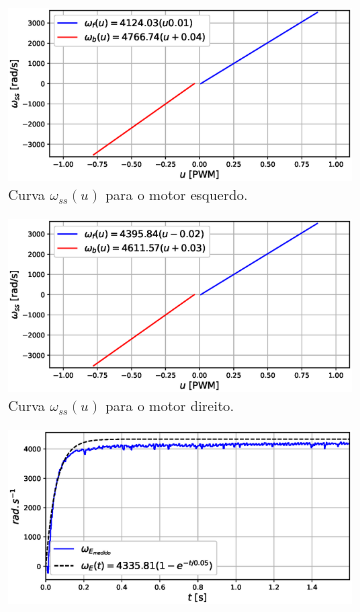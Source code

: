 \begin{figure}[H]
    \begin{subfigure}{.5\textwidth}
    \centering
    \includegraphics[width=\textwidth]{figuras/resultados/exp03/curva_feedforward_esquerdo100.eps}
    \caption{Curva $\omega_{ss}(u)$ para o motor esquerdo.}
    \label{fig:exp03:curva_feedforward_esquerdo}
    \end{subfigure}
    \hfill
    \begin{subfigure}{.5\textwidth}
    \centering
    \includegraphics[width=\textwidth]{figuras/resultados/exp03/curva_feedforward_direito100.eps}
    \caption{Curva $\omega_{ss}(u)$ para o motor direito.}
    \label{fig:exp03:curva_feedforward_direito}
    \end{subfigure}
    \begin{subfigure}{.5\textwidth}
    \centering
    \includegraphics[width=\textwidth]{figuras/resultados/exp03/regressao_vs_medido_esquerdo100.eps}

\end{subfigure}
\end{figure}
